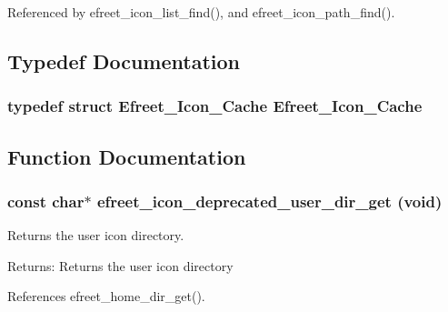 Referenced by efreet\_\-icon\_\-list\_\-find(), and efreet\_\-icon\_\-path\_\-find().

\subsection{Typedef Documentation}
\subsubsection{\setlength{\rightskip}{0pt plus 5cm}typedef struct {\bf Efreet\_\-Icon\_\-Cache} {\bf Efreet\_\-Icon\_\-Cache}}\label{efreet__icon_8c_357003192381c449f058fd0380580be7}




\subsection{Function Documentation}
\subsubsection{\setlength{\rightskip}{0pt plus 5cm}const char$\ast$ efreet\_\-icon\_\-deprecated\_\-user\_\-dir\_\-get (void)}\label{efreet__icon_8c_cc8dbdb67b18a402ac80b3121bb590e5}


Returns the user icon directory. 

\begin{Desc}
\item[Returns:]Returns the user icon directory \end{Desc}


References efreet\_\-home\_\-dir\_\-get().